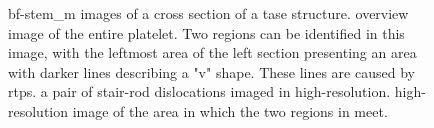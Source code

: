 \begin{figure}
{{        }
    }
    \caption[\acs{bf}-\acs{stem_m} images of a cross section perpendicular to the growth direction of a \acs{tase} structure.]{\acs{bf}-\acs{stem_m} images of a cross section of a \acs{tase} structure.  overview image of the entire platelet. Two regions can be identified in this image, with the leftmost area of the left section presenting an area with darker lines describing a "v" shape. These lines are caused by \acs{rtp}s.  a pair of stair-rod dislocations \cite{Bologna2018} imaged in high-resolution.  high-resolution image of the area in which the two regions in  meet.}
    \label{fig:2020_Merge}
\end{figure}

